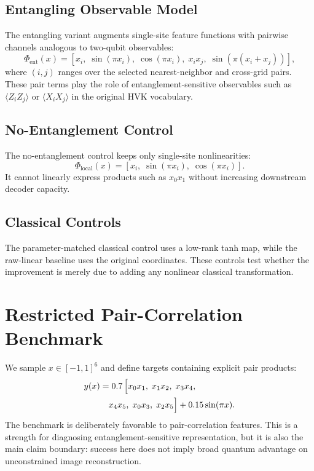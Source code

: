 \documentclass[journal]{IEEEtran}
\begin{document}
\subsection{Entangling Observable Model}
The entangling variant augments single-site feature functions with pairwise channels analogous to two-qubit observables:
\begin{equation}
\Phi_{\mathrm{ent}}(x)=
\left[x_i,\;\sin(\pi x_i),\;\cos(\pi x_i),\;x_ix_j,\;\sin(\pi(x_i+x_j))\right],
\end{equation}
where $(i,j)$ ranges over the selected nearest-neighbor and cross-grid pairs. These pair terms play the role of entanglement-sensitive observables such as $\langle Z_iZ_j\rangle$ or $\langle X_iX_j\rangle$ in the original HVK vocabulary.

\subsection{No-Entanglement Control}
The no-entanglement control keeps only single-site nonlinearities:
\begin{equation}
\Phi_{\mathrm{local}}(x)=\left[x_i,\;\sin(\pi x_i),\;\cos(\pi x_i)\right].
\end{equation}
It cannot linearly express products such as $x_0x_1$ without increasing downstream decoder capacity.

\subsection{Classical Controls}
The parameter-matched classical control uses a low-rank tanh map, while the raw-linear baseline uses the original coordinates. These controls test whether the improvement is merely due to adding any nonlinear classical transformation.

\section{Restricted Pair-Correlation Benchmark}
We sample $x\in[-1,1]^6$ and define targets containing explicit pair products:
\begin{align}
y(x) &= 0.7\,\Bigl[x_0x_1,\;x_1x_2,\;x_3x_4,\nonumber\\
&\quad x_4x_5,\;x_0x_3,\;x_2x_5\Bigr]
+0.15\sin(\pi x).
\end{align}
The benchmark is deliberately favorable to pair-correlation features. This is a strength for diagnosing entanglement-sensitive representation, but it is also the main claim boundary: success here does not imply broad quantum advantage on unconstrained image reconstruction.
\end{document}
